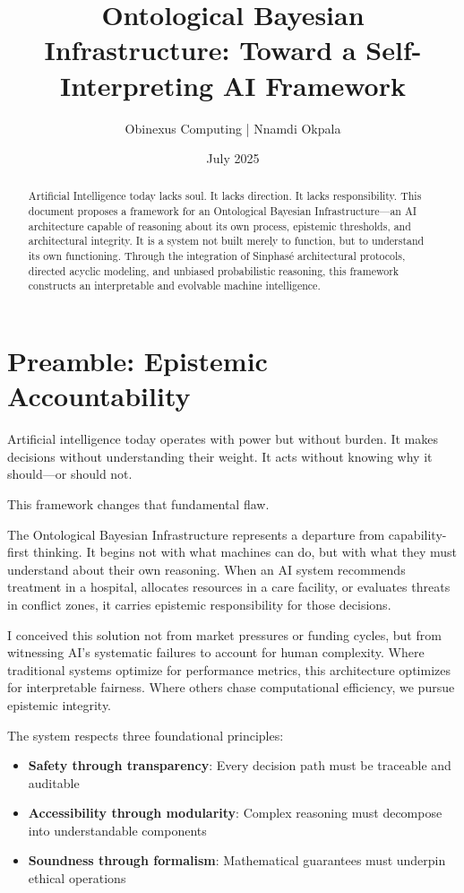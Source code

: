 \documentclass{article}
\title{Ontological Bayesian Infrastructure: Toward a Self-Interpreting AI Framework}
\author{Obinexus Computing | Nnamdi Okpala}
\date{July 2025}
\begin{document}
\maketitle

\begin{abstract}
Artificial Intelligence today lacks soul. It lacks direction. It lacks responsibility. This document proposes a framework for an Ontological Bayesian Infrastructure---an AI architecture capable of reasoning about its own process, epistemic thresholds, and architectural integrity. It is a system not built merely to function, but to understand its own functioning. Through the integration of Sinphasé architectural protocols, directed acyclic modeling, and unbiased probabilistic reasoning, this framework constructs an interpretable and evolvable machine intelligence.
\end{abstract}

\section{Preamble: Epistemic Accountability}

Artificial intelligence today operates with power but without burden. It makes decisions without understanding their weight. It acts without knowing why it should—or should not.

This framework changes that fundamental flaw.

The Ontological Bayesian Infrastructure represents a departure from capability-first thinking. It begins not with what machines can do, but with what they must understand about their own reasoning. When an AI system recommends treatment in a hospital, allocates resources in a care facility, or evaluates threats in conflict zones, it carries epistemic responsibility for those decisions.

I conceived this solution not from market pressures or funding cycles, but from witnessing AI's systematic failures to account for human complexity. Where traditional systems optimize for performance metrics, this architecture optimizes for interpretable fairness. Where others chase computational efficiency, we pursue epistemic integrity.

The system respects three foundational principles:
\begin{itemize}
  \item \textbf{Safety through transparency}: Every decision path must be traceable and auditable
  \item \textbf{Accessibility through modularity}: Complex reasoning must decompose into understandable components  
  \item \textbf{Soundness through formalism}: Mathematical guarantees must underpin ethical operations
\end{itemize}
\end{document}
